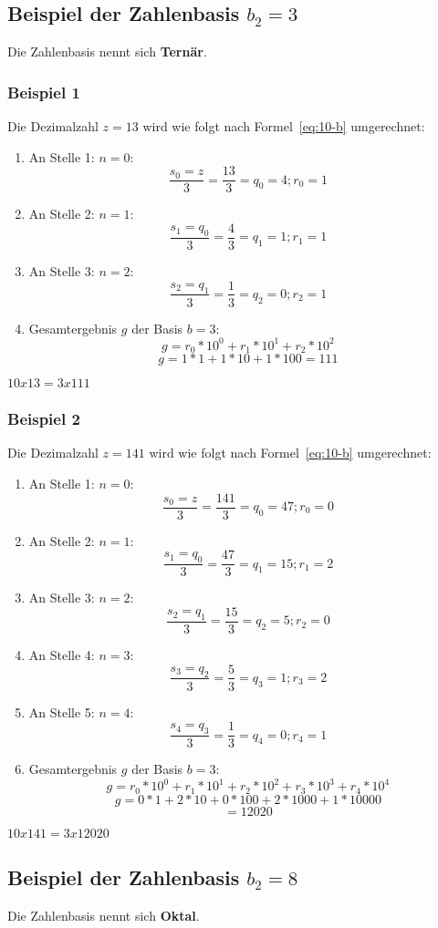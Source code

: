 \subsection{Beispiel der Zahlenbasis $b_{2}=3$}
Die Zahlenbasis nennt sich \textbf{Ternär}.
\subsubsection{Beispiel 1}
Die Dezimalzahl $z=13$ wird wie folgt nach Formel~\ref{eq:10-b} umgerechnet:
\begin{enumerate}
	\item An Stelle 1: $n=0$: \[\frac{s_{0}=z}{3}=\frac{13}{3}=q_{0}=4;r_{0}=1\]
	\item An Stelle 2: $n=1$: \[\frac{s_{1}=q_{0}}{3}=\frac{4}{3}=q_{1}=1;r_{1}=1\]
	\item An Stelle 3: $n=2$: \[\frac{s_{2}=q_{1}}{3}=\frac{1}{3}=q_{2}=0;r_{2}=1\]
	\item Gesamtergebnis $g$ der Basis $b=3$: \[g=r_{0}*10^{0}+r_{1}*10^{1}+r_{2}*10^{2}\] \[g=1*1+1*10+1*100=111\]
\end{enumerate}
\(10x13=3x111\)
\subsubsection{Beispiel 2}
Die Dezimalzahl $z=141$ wird wie folgt nach Formel~\ref{eq:10-b} umgerechnet:
\begin{enumerate}
    \item An Stelle 1: $n=0$: \[\frac{s_{0}=z}{3}=\frac{141}{3}=q_{0}=47; r_{0}=0\]
    \item An Stelle 2: $n=1$: \[\frac{s_{1}=q_{0}}{3}=\frac{47}{3}=q_{1}=15; r_{1}=2\]
    \item An Stelle 3: $n=2$: \[\frac{s_{2}=q_{1}}{3}=\frac{15}{3}=q_{2}=5; r_{2}=0\]
    \item An Stelle 4: $n=3$: \[\frac{s_{3}=q_{2}}{3}=\frac{5}{3}=q_{3}=1; r_{3}=2\]
    \item An Stelle 5: $n=4$: \[\frac{s_{4}=q_{3}}{3}=\frac{1}{3}=q_{4}=0; r_{4}=1\]
    \item Gesamtergebnis $g$ der Basis $b=3$: \[g=r_{0}*10^{0}+r_{1}*10^{1}+r_{2}*10^{2}+r_{3}*10^{3}+r_{4}*10^{4}\] \[g=0*1+2*10+0*100+2*1000+1*10000\]\[=12020\]
\end{enumerate}
\(10x141=3x12020\)

\subsection{Beispiel der Zahlenbasis $b_{2}=8$}
Die Zahlenbasis nennt sich \textbf{Oktal}.
